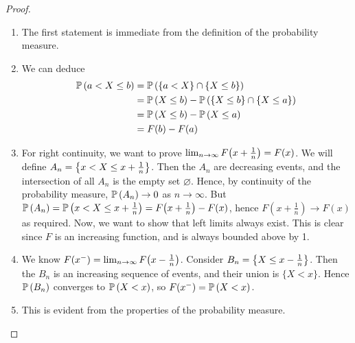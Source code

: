 \begin{proof}
	\begin{enumerate}
		\item The first statement is immediate from the definition of the probability measure.
		\item We can deduce
		      \begin{align*}
			      \mathbb{P}\left({a < X \leq b}\right) & = \mathbb{P}\left({\{ a < X \} \cap \{ X \leq b \}}\right)                  \\
			                          & = \mathbb{P}\left({X \leq b}\right) - \mathbb{P}\left({\{X \leq b\} \cap \{X \leq a\}}\right) \\
			                          & = \mathbb{P}\left({X \leq b}\right) - \mathbb{P}\left({X \leq a}\right)                       \\
			                          & = F(b) - F(a)
		      \end{align*}
		\item For right continuity, we want to prove \(\lim_{n \to \infty} F\qty(x + \frac{1}{n}) = F(x)\).
		      We will define \(A_n = \qty{ x < X \leq x + \frac{1}{n} }\).
		      Then the \(A_n\) are decreasing events, and the intersection of all \(A_n\) is the empty set \(\varnothing\).
		      Hence, by continuity of the probability measure, \(\mathbb{P}\left({A_n}\right) \to 0\) as \(n \to \infty\).
		      But \(\mathbb{P}\left({A_n}\right) = \mathbb{P}\left({x < X \leq x + \frac{1}{n}}\right) = F\qty(x + \frac{1}{n}) - F(x)\), hence \(F(x + \frac{1}{n}) \to F(x)\) as required.
		      Now, we want to show that left limits always exist.
		      This is clear since \(F\) is an increasing function, and is always bounded above by 1.
		\item We know \(F(x^-) = \lim_{n \to \infty}F\qty(x - \frac{1}{n})\).
		      Consider \(B_n = \qty{ X \leq x - \frac{1}{n} }\).
		      Then the \(B_n\) is an increasing sequence of events, and their union is \(\{ X < x \}\).
		      Hence \(\mathbb{P}\left({B_n}\right)\) converges to \(\mathbb{P}\left({X < x}\right)\), so \(F(x^-) = \mathbb{P}\left({X < x}\right)\).
		\item This is evident from the properties of the probability measure.
	\end{enumerate}
\end{proof}

